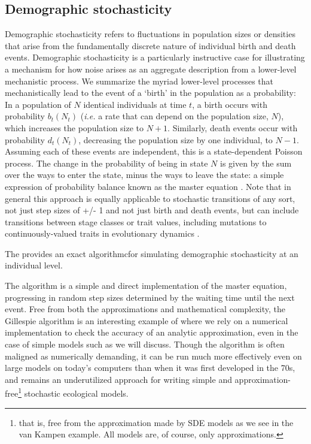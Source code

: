 \documentclass[preprint, 3p,
authoryear]{elsarticle} %
\begin{document}
\hypertarget{demographic-stochasticity}{%
\subsection{Demographic stochasticity}\label{demographic-stochasticity}}

Demographic stochasticity refers to fluctuations in population sizes or
densities that arise from the fundamentally discrete nature of
individual birth and death events. Demographic stochasticity is a
particularly instructive case for illustrating a mechanism for how noise
arises as an aggregate description from a lower-level mechanistic
process. We summarize the myriad lower-level processes that
mechanistically lead to the event of a `birth' in the population as a
probability: In a population of \(N\) identical individuals at time
\(t\), a birth occurs with probability \(b_t(N_t)\) (\emph{i.e.} a rate
that can depend on the population size, \(N\)), which increases the
population size to \(N+1\). Similarly, death events occur with
probability \(d_t(N_t)\), decreasing the population size by one
individual, to \(N-1\). Assuming each of these events are independent,
this is a state-dependent Poisson process. The change in the probability
of being in state \(N\) is given by the sum over the ways to enter the
state, minus the ways to leave the state: a simple expression of
probability balance known as the master equation \citep{vanKampen2007}.
Note that in general this approach is equally applicable to stochastic
transitions of any sort, not just step sizes of +/- 1 and not just birth
and death events, but can include transitions between stage classes or
trait values, including mutations to continuously-valued traits in
evolutionary dynamics \citep[e.g.][]{Boettiger2010}.

The \citet{Gillespie1977} provides an exact algorithmcfor simulating
demographic stochasticity at an individual level.

The algorithm is a simple and direct implementation of the master
equation, progressing in random step sizes determined by the waiting
time until the next event. Free from both the approximations and
mathematical complexity, the Gillespie algorithm is an interesting
example of where we rely on a numerical implementation to check the
accuracy of an analytic approximation, even in the case of simple models
such as we will discuss. Though the algorithm is often maligned as
numerically demanding, it can be run much more effectively even on large
models on today's computers than when it was first developed in the 70s,
and remains an underutilized approach for writing simple and
approximation-free\footnote{that is, free from the approximation made by
  SDE models as we see in the van Kampen example. All models are, of
  course, only approximations.} stochastic ecological models.
\end{document}
